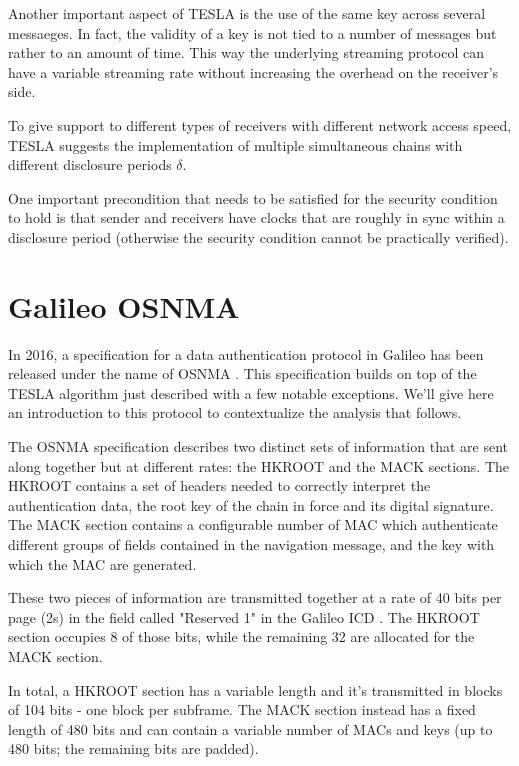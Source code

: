 Another important aspect of TESLA is the use of the same key across several
messaeges. In fact, the validity of a key is not tied to a number of messages
but rather to an amount of time. This way the underlying streaming protocol can
have a variable streaming rate without increasing the overhead on the receiver's
side.

To give support to different types of receivers with different network access
speed, TESLA suggests the implementation of multiple simultaneous chains with
different disclosure periods $\delta$.

One important precondition that needs to be satisfied for the security condition
to hold is that sender and receivers have clocks that are roughly in sync within
a disclosure period (otherwise the security condition cannot be practically
verified).

\section{Galileo OSNMA}
In 2016, a specification for a data authentication protocol in Galileo has been
released under the name of OSNMA \cite{osnma}. This specification builds on top
of the TESLA algorithm just described with a few notable exceptions. We'll give
here an introduction to this protocol to contextualize the analysis that
follows.

\par

The OSNMA specification describes two distinct sets of information that are sent
along together but at different rates: the HKROOT and the MACK sections. The
HKROOT contains a set of headers needed to correctly interpret the
authentication data, the root key of the chain in force and its digital
signature. The MACK section contains a configurable number of MAC which
authenticate different groups of fields contained in the navigation message, and
the key with which the MAC are generated.

These two pieces of information are transmitted together at a rate of 40 bits
per page (2s) in the field called "Reserved 1" in the Galileo ICD
\cite{galileoicd}. The HKROOT section occupies 8 of those bits, while the
remaining 32 are allocated for the MACK section.


In total, a HKROOT section has a variable length and it's transmitted in blocks
of 104 bits - one block per subframe. The MACK section instead has a fixed
length of 480 bits and can contain a variable number of MACs and keys (up to 480
bits; the remaining bits are padded).

